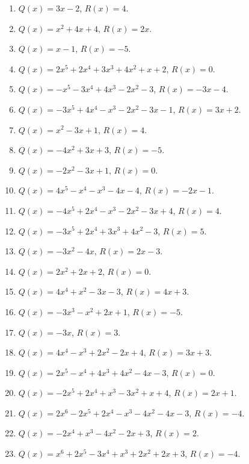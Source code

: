 \documentclass[11pt,oneside]{book}
\begin{document}
\begin{enumerate}[leftmargin=*,label=\textbf{O\arabic*.},itemsep=0.45\baselineskip]
\item $Q(x)=3 x - 2$, $R(x)=4$.
\item $Q(x)=x^{2} + 4 x + 4$, $R(x)=2 x$.
\item $Q(x)=x - 1$, $R(x)=-5$.
\item $Q(x)=2 x^{5} + 2 x^{4} + 3 x^{3} + 4 x^{2} + x + 2$, $R(x)=0$.
\item $Q(x)=- x^{5} - 3 x^{4} + 4 x^{3} - 2 x^{2} - 3$, $R(x)=- 3 x - 4$.
\item $Q(x)=- 3 x^{5} + 4 x^{4} - x^{3} - 2 x^{2} - 3 x - 1$, $R(x)=3 x + 2$.
\item $Q(x)=x^{2} - 3 x + 1$, $R(x)=4$.
\item $Q(x)=- 4 x^{2} + 3 x + 3$, $R(x)=-5$.
\item $Q(x)=- 2 x^{2} - 3 x + 1$, $R(x)=0$.
\item $Q(x)=4 x^{5} - x^{4} - x^{3} - 4 x - 4$, $R(x)=- 2 x - 1$.
\item $Q(x)=- 4 x^{5} + 2 x^{4} - x^{3} - 2 x^{2} - 3 x + 4$, $R(x)=4$.
\item $Q(x)=- 3 x^{5} + 2 x^{4} + 3 x^{3} + 4 x^{2} - 3$, $R(x)=5$.
\item $Q(x)=- 3 x^{2} - 4 x$, $R(x)=2 x - 3$.
\item $Q(x)=2 x^{2} + 2 x + 2$, $R(x)=0$.
\item $Q(x)=4 x^{4} + x^{2} - 3 x - 3$, $R(x)=4 x + 3$.
\item $Q(x)=- 3 x^{3} - x^{2} + 2 x + 1$, $R(x)=-5$.
\item $Q(x)=- 3 x$, $R(x)=3$.
\item $Q(x)=4 x^{4} - x^{3} + 2 x^{2} - 2 x + 4$, $R(x)=3 x + 3$.
\item $Q(x)=2 x^{5} - x^{4} + 4 x^{3} + 4 x^{2} - 4 x - 3$, $R(x)=0$.
\item $Q(x)=- 2 x^{5} + 2 x^{4} + x^{3} - 3 x^{2} + x + 4$, $R(x)=2 x + 1$.
\item $Q(x)=2 x^{6} - 2 x^{5} + 2 x^{4} - x^{3} - 4 x^{2} - 4 x - 3$, $R(x)=-4$.
\item $Q(x)=- 2 x^{4} + x^{3} - 4 x^{2} - 2 x + 3$, $R(x)=2$.
\item $Q(x)=x^{6} + 2 x^{5} - 3 x^{4} + x^{3} + 2 x^{2} + 2 x + 3$, $R(x)=-4$.
\end{enumerate}
\end{document}
